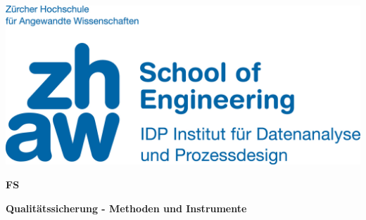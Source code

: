 \noindent
\begin{minipage}[t]{0.4\textwidth} 
\includegraphics[width=\linewidth]{logo.jpg}
\end{minipage}%
\hfill%
\begin{minipage}[t]{0.4\textwidth}\raggedleft
\textbf{\large FS \the\year}
\end{minipage}

\begin{center}
 \textbf{\large Qualitätssicherung - Methoden und Instrumente} \\
 \vspace{0.3cm}
\end{center}
